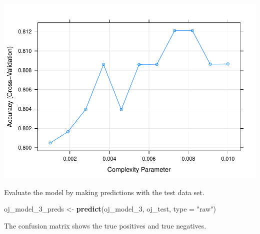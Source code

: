 \documentclass[]{book}
\newenvironment{Shaded}{\begin{snugshade}}{\end{snugshade}}
\newcommand{\DataTypeTok}[1]{\textcolor[rgb]{0.13,0.29,0.53}{#1}}
\newcommand{\DecValTok}[1]{\textcolor[rgb]{0.00,0.00,0.81}{#1}}
\newcommand{\KeywordTok}[1]{\textcolor[rgb]{0.13,0.29,0.53}{\textbf{#1}}}
\newcommand{\NormalTok}[1]{#1}
\newcommand{\OperatorTok}[1]{\textcolor[rgb]{0.81,0.36,0.00}{\textbf{#1}}}
\newcommand{\StringTok}[1]{\textcolor[rgb]{0.31,0.60,0.02}{#1}}
\begin{document}
\includegraphics{data-sci_files/figure-latex/unnamed-chunk-53-1.pdf}

Evaluate the model by making predictions with the test data set.

\begin{Shaded}
\begin{Highlighting}[]
\NormalTok{oj_model_}\DecValTok{3}\NormalTok{_preds <-}\StringTok{ }\KeywordTok{predict}\NormalTok{(oj_model_}\DecValTok{3}\NormalTok{, oj_test, }\DataTypeTok{type =} \StringTok{"raw"}\NormalTok{)}
\end{Highlighting}
\end{Shaded}

The confusion matrix shows the true positives and true negatives.

\begin{Shaded}
\end{Shaded}
\end{document}
